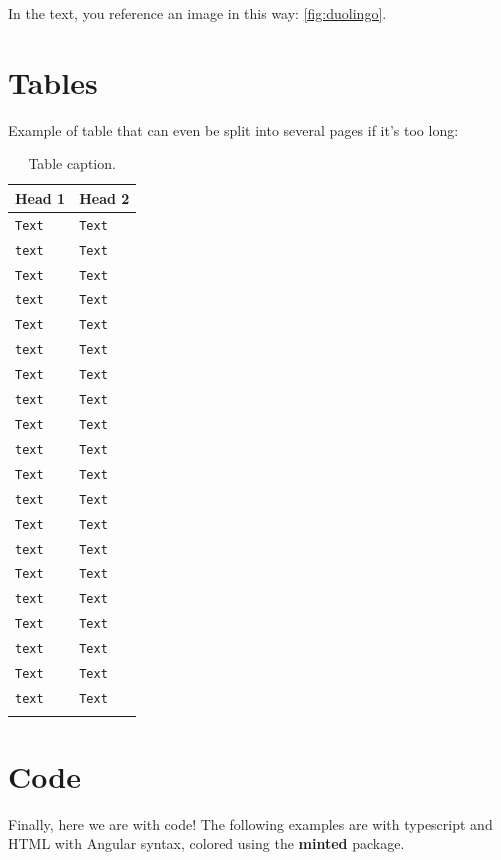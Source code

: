 In the text, you reference an image in this way: \ref{fig:duolingo}.

\section{Tables}
Example of table that can even be split into several pages if it's too long:
\begin{longtable}[H]{| l | l |}
    \hline
     \rowcolor[HTML]{F87C58}\textbf{Head 1} & \textbf{Head 2}\\
    \hline
    \endfirsthead
    
    \texttt{Text} & \texttt{Text}\\
    \hline
    \texttt{text} & \texttt{Text}\\
    \hline
    \texttt{Text} & \texttt{Text}\\
    \hline
    \texttt{text} & \texttt{Text}\\
    \hline
    \texttt{Text} & \texttt{Text}\\
    \hline
    \texttt{text} & \texttt{Text}\\
    \hline
    \texttt{Text} & \texttt{Text}\\
    \hline
    \texttt{text} & \texttt{Text}\\
    \hline
    \texttt{Text} & \texttt{Text}\\
    \hline
    \texttt{text} & \texttt{Text}\\
    \hline
    \texttt{Text} & \texttt{Text}\\
    \hline
    \texttt{text} & \texttt{Text}\\
    \hline
    \texttt{Text} & \texttt{Text}\\
    \hline
    \texttt{text} & \texttt{Text}\\
    \hline
    \texttt{Text} & \texttt{Text}\\
    \hline
    \texttt{text} & \texttt{Text}\\
    \hline
    \texttt{Text} & \texttt{Text}\\
    \hline
    \texttt{text} & \texttt{Text}\\
    \hline
    \texttt{Text} & \texttt{Text}\\
    \hline
    \texttt{text} & \texttt{Text}\\
    \hline
    \caption{Table caption.}
\end{longtable}

\section{Code}
Finally, here we are with code! The following examples are with typescript and HTML with Angular syntax, colored using the \textbf{minted} package.

\begin{code}
    \inputminted{typescript}{listings/ts-example.ts}
    \caption{Caption for the typescript example.}
\end{code}
\vspace{4mm}

\begin{code}
    \inputminted{ng2}{listings/html-example.html}
    \caption{Caption for the HTML with Angular syntax example.}
\end{code}
\vspace{4mm}
